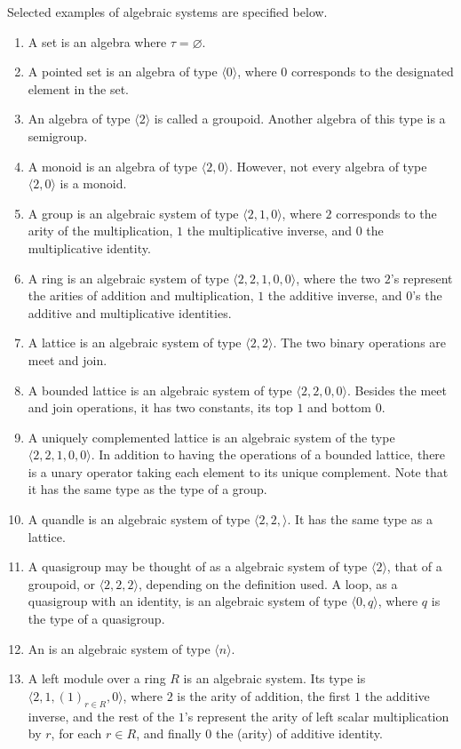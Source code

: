 \documentclass[12pt]{article}
\begin{document}
Selected examples of algebraic systems are specified below.

\begin{enumerate}
\item A set is an algebra where $\tau=\varnothing$.
\item A pointed set is an algebra of type $\langle 0\rangle$, where $0$ corresponds to the designated element in the set.
\item An algebra of type $\langle 2\rangle$ is called a groupoid.  Another algebra of this type is a semigroup.
\item A monoid is an algebra of type $\langle 2,0\rangle$.  However, not every algebra of type $\langle 2,0\rangle$ is a monoid.
\item A group is an algebraic system of type $\langle 2,1,0\rangle$, where $ 2$ corresponds to the arity of the multiplication, $1$ the multiplicative inverse, and $0$ the multiplicative identity.
\item A ring is an algebraic system of type $\langle 2,2,1,0,0\rangle$, where the two $2$'s represent the arities of  addition and multiplication, $1$ the additive inverse, and $0$'s the additive and multiplicative identities. 
\item A lattice is an algebraic system of type $\langle 2,2\rangle$.  The two binary operations are meet and join.
\item A bounded lattice is an algebraic system of type $\langle 2,2,0,0\rangle$.  Besides the meet and join operations, it has two constants, its top $1$ and bottom $0$.
\item A uniquely complemented lattice is an algebraic system of the type $\langle 2,2,1,0,0\rangle$.  In addition to having the operations of a bounded lattice, there is a unary operator taking each element to its unique complement.  Note that it has the same type as the type of a group.
\item A quandle is an algebraic system of type $\langle 2,2,\rangle$.  It has the same type as a lattice.
\item A quasigroup may be thought of as a algebraic system of type $\langle 2\rangle$, that of a groupoid, or $\langle 2,2,2\rangle$, depending on the definition used.  A loop, as a quasigroup with an identity, is an algebraic system of type $\langle 0,q\rangle$, where $q$ is the type of a quasigroup.
\item An  is an algebraic system of type $\langle n\rangle$.
\item A left module over a ring $R$ is an algebraic system.  Its type is $\langle 2, 1, (1)_{r\in R}, 0\rangle$, where $2$ is the arity of addition, the first $1$ the additive inverse, and the rest of the $1$'s represent the arity of left scalar multiplication by $r$, for each $r\in R$, and finally $0$ the (arity) of additive identity.

\end{enumerate}
\end{document}
